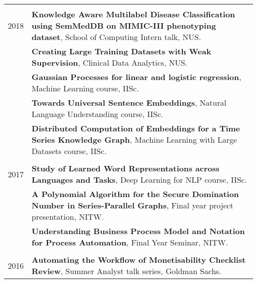 \documentclass[a4paper,10pt]{article}
\begin{document}
\begin{tabularx}{\textwidth}{r|X}
\multicolumn{2}{c}{} \\
2018 & \textbf{Knowledge  Aware  Multilabel  Disease  Classification using  SemMedDB on MIMIC-III phenotyping dataset}, School of Computing Intern talk, NUS.\\[4ex]
& \textbf{Creating Large Training Datasets with Weak Supervision}, Clinical Data Analytics, NUS.\\[2ex]
& \textbf{Gaussian Processes for linear and logistic regression}, Machine Learning course, IISc.\\[2ex]
& \textbf{Towards Universal Sentence Embeddings}, Natural Language Understanding course, IISc.\\[4ex]
& \textbf{Distributed Computation of Embeddings for a Time Series Knowledge Graph}, Machine Learning with Large Datasets course, IISc.\\
 \multicolumn{2}{c}{} \\
 
2017 & \textbf{Study of Learned Word Representations across Languages and Tasks}, Deep Learning for NLP course, IISc. \\[4ex]
& \textbf{A Polynomial Algorithm for the Secure Domination Number in Series-Parallel Graphs}, Final year project presentation, NITW.\\[4ex]
&\textbf{Understanding Business Process Model and Notation for Process Automation}, Final Year Seminar, NITW.\\
 \multicolumn{2}{c}{} \\
  
2016 & \textbf{Automating the Workflow of Monetisability Checklist Review}, 
Summer Analyst talk series, Goldman Sachs.\\
\end{tabularx}
\end{document}

